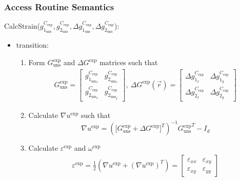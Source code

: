 \documentclass[12pt, titlepage]{article}
\begin{document}
\subsubsection{Access Routine Semantics}

\noindent CalcStrain($g_{1_{{\text{uns}}}}^{C_{\text{exp}}},g_{2_{{\text{uns}}}}^{C_{\text{exp}}},\Delta g_{1_{{\text{uns}}}}^{C_{\text{exp}}},\Delta g_{2_{{\text{uns}}}}^{C_{\text{exp}}}$):
\begin{itemize}
\item transition:
\begin{enumerate}
\item Form ${{G_{\text{uns}}^{\text{exp}}}}$ and $\Delta G^{\text{exp}}$ matrices such that
\begin{equation*}
\begin{gathered}
G_{\text{uns}}^{\text{exp}} =
	\begin{bmatrix}
	g_{1_{{\text{uns}}_x}}^{C_{\text{exp}}} & g_{2_{{\text{uns}}_x}}^{C_{\text{exp}}} \\
	g_{2_{{\text{uns}}_x}}^{C_{\text{exp}}} & g_{2_{{\text{uns}}_y}}^{C_{\text{exp}}} 
	\end{bmatrix}, \ 
\Delta G^{\text{exp}}(\vec{r})=
	\begin{bmatrix}
	\Delta g_{1_{x}}^{C_{\text{exp}}} & \Delta g_{1_{y}}^{C_{\text{exp}}}\\
	\Delta g_{2_{x}}^{C_{\text{exp}}} & \Delta g_{2_{y}}^{C_{\text{exp}}}
	\end{bmatrix}
\end{gathered}
\end{equation*}
\item Calculate $\nabla u^{\text{exp}}$ such that
\begin{equation*}
\nabla u^{\text{exp}} = ({[{G_{\text{uns}}^{\text{exp}}}+\Delta G^{\text{exp}}}]^{T})^{-1}{{G_{\text{uns}}^{\text{exp}}}}^{T}-I_{d}
\end{equation*}
\item Calculate $\varepsilon^{\text{exp}}$ and $\omega^{\text{exp}}$
\begin{equation*}
\begin{gathered}
\varepsilon^{\text{exp}} = \frac{1}{2}(\nabla u^{\text{exp}}+(\nabla u^{\text{exp}})^{T})= \begin{bmatrix}
	\varepsilon_{\mathit{xx}} & \varepsilon_{\mathit{xy}} \\
	\varepsilon_{\mathit{xy}} & \varepsilon_{\mathit{yy}}
	\end{bmatrix} \\

\end{gathered}
\end{equation*}
\end{enumerate}
\end{itemize}
\end{document}
